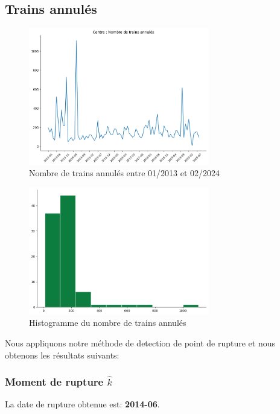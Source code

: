 {\subsection{Trains annulés}

\begin{figure}[H]
  \centering
  \includegraphics[width=0.7\textwidth]{image/Cn-FIG07.png}
  \caption{Nombre de trains annulés entre 01/2013 et 02/2024}
\end{figure}

\begin{figure}[H]
  \centering
  \includegraphics[width=0.7\textwidth]{image/Cn-FIG08.png}
  \caption{Histogramme du nombre de trains annulés}
\end{figure}

Nous appliquons notre méthode de detection de point de rupture et nous obtenons les résultats suivants:

\subsubsection{Moment de rupture $\hat{k}$}

La date de rupture obtenue est: \textbf{2014-06}. 


}
